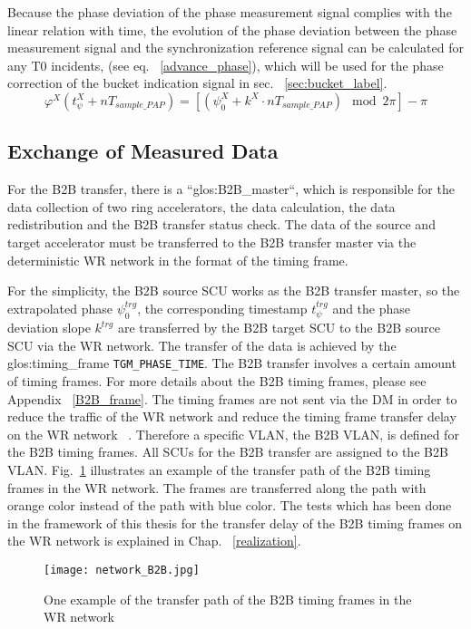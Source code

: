 Because the phase deviation of the phase measurement signal complies with the linear relation with time, the evolution of the phase deviation between the phase measurement signal and the synchronization reference signal can be calculated for any T0 incidents, (see eq. ~\ref{advance_phase}), which will be used for the phase correction of the bucket indication signal in sec. ~\ref{sec:bucket_label}.
\begin{equation}
\label{advance_phase}
\varphi^\mathit{X}(t_\mathit{\psi}^\mathit{X}+nT_\mathit{sample\_PAP})=[(\psi^\mathit{X}_0+k^\mathit{X}\cdot nT_\mathit{sample\_PAP}) \mod 2\pi] - \pi
\end{equation}

\subsection{Exchange of Measured Data}

For the B2B transfer, there is a ``\gls{glos:B2B_master}``, which is responsible for the data collection of two ring accelerators, the data calculation, the data redistribution and the B2B transfer status check. The data of the source and target accelerator must be transferred to the B2B transfer master via the deterministic WR network in the format of the timing frame.
 
For the simplicity, the B2B source SCU works as the B2B transfer master, so the extrapolated phase $\psi^\mathit{trg}_0$, the corresponding timestamp $t_\psi^\mathit{trg}$ and the phase deviation slope $k^\mathit{trg}$ are transferred by the B2B target SCU to the B2B source SCU via the WR network. The transfer of the data is achieved by the \gls{glos:timing_frame} \verb|TGM_PHASE_TIME|. The B2B transfer involves a certain amount of timing frames. For more details about the B2B timing frames, please see Appendix ~\ref{B2B_frame}. The timing frames are not sent via the DM in order to reduce the traffic of the WR network and reduce the timing frame transfer delay on the WR network ~\cite{bai_f-tc-c-05_2016}. Therefore a specific VLAN, the B2B \gls{VLAN}, is defined for the B2B timing frames. All SCUs for the B2B transfer are assigned to the B2B VLAN. Fig.~\ref{network_B2B} illustrates an example of the transfer path of the B2B timing frames in the WR network. The frames are transferred along the path with orange color instead of the path with blue color. The tests which has been done in the framework of this thesis for the transfer delay of the B2B timing frames on the WR network is explained in Chap. ~\ref{realization}.
 \begin{figure}[!htb]
   \centering   
   \texttt{[image: network\_B2B.jpg]}
   \caption{One example of the transfer path of the B2B timing frames in the WR network}
   \label{network_B2B}
\end{figure}
